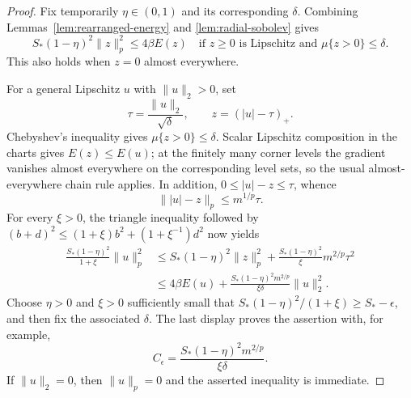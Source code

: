 \begin{proof}
Fix temporarily $\eta\in(0,1)$ and its corresponding $\delta$.
Combining Lemmas~\ref{lem:rearranged-energy} and
\ref{lem:radial-sobolev} gives
\begin{equation}
 S_*(1-\eta)^2\|z\|_p^2\le4\beta E(z)
 \quad\text{if }z\ge0\text{ is Lipschitz and }\mu\{z>0\}\le\delta.
 \label{eq:small-support-sobolev}
\end{equation}
This also holds when $z=0$ almost everywhere.

For a general Lipschitz $u$ with $\|u\|_2>0$, set
\[
 \tau=\frac{\|u\|_2}{\sqrt\delta},\qquad z=(|u|-\tau)_+.
\]
Chebyshev's inequality gives $\mu\{z>0\}\le\delta$.
Scalar Lipschitz composition in the charts gives $E(z)\le E(u)$;
at the finitely many corner levels the gradient vanishes almost
everywhere on the corresponding level sets, so the usual
almost-everywhere chain rule applies.  In addition,
$0\le|u|-z\le\tau$, whence
\[
 \||u|-z\|_p\le m^{1/p}\tau.
\]
For every $\xi>0$, the triangle inequality followed by
$(b+d)^2\le(1+\xi)b^2+(1+\xi^{-1})d^2$ now yields
\begin{align*}
 \frac{S_*(1-\eta)^2}{1+\xi}\|u\|_p^2
 &\le S_*(1-\eta)^2\|z\|_p^2
       +\frac{S_*(1-\eta)^2}{\xi}m^{2/p}\tau^2\\
 &\le4\beta E(u)
       +\frac{S_*(1-\eta)^2m^{2/p}}{\xi\delta}\|u\|_2^2.
\end{align*}
Choose $\eta>0$ and $\xi>0$ sufficiently small that
$S_*(1-\eta)^2/(1+\xi)\ge S_*-\epsilon$, and then fix the associated
$\delta$.  The last display proves the assertion with, for example,
\[
 C_\epsilon=\frac{S_*(1-\eta)^2m^{2/p}}{\xi\delta}.
\]
If $\|u\|_2=0$, then $\|u\|_p=0$ and the asserted inequality is
immediate.
\end{proof}
